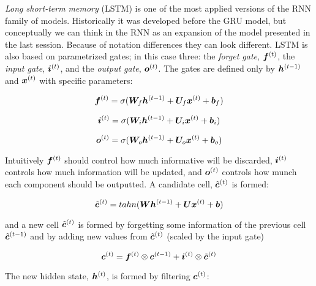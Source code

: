 \textit{Long short-term memory} (LSTM) is one of the most applied versions of the RNN family of models. Historically it was developed before the GRU model, but conceptually we can think in the RNN as an expansion of the model presented in the last session. Because of notation differences they can look different. LSTM is also based on parametrized gates; in this case three: the \textit{forget gate}, $\bm{f}^{(t)}$, the \textit{input gate}, $\bm{i}^{(t)}$, and the \textit{output gate}, $\bm{o}^{(t)}$. The gates are defined only by $\bm{h}^{(t-1)}$ and $\bm{x}^{(t)}$ with specific parameters:

\begin{equation}
\bm{f}^{(t)} = \sigma(\bm{W}_{f} \bm{h}^{(t-1)} + \bm{U}_{f} \bm{x}^{(t)} + \bm{b}_{f})
\end{equation}

\begin{equation}
\bm{i}^{(t)} = \sigma(\bm{W}_{i} \bm{h}^{(t-1)} + \bm{U}_{i} \bm{x}^{(t)} + \bm{b}_{i})
\end{equation}

\begin{equation}
\bm{o}^{(t)} = \sigma(\bm{W}_{o} \bm{h}^{(t-1)} + \bm{U}_{o} \bm{x}^{(t)} + \bm{b}_{o})
\end{equation}

Intuitively $\bm{f}^{(t)}$ should control how much informative will be discarded, $\bm{i}^{(t)}$ controls how much information will be updated, and $\bm{o}^{(t)}$ controls how munch each component should be outputted. A candidate cell, $\tilde{\bm{c}}^{(t)}$ is formed:

\begin{equation}
\tilde{\bm{c}}^{(t)} = tahn(\bm{W} \bm{h}^{(t-1)} + \bm{U} \bm{x}^{(t)} + \bm{b})
\end{equation}

and a new cell $\tilde{\bm{c}}^{(t)}$ is formed by forgetting some information of the previous cell $\tilde{\bm{c}}^{(t-1)}$ and by adding new values from $\tilde{\bm{c}}^{(t)}$ (scaled by the input gate)

\begin{equation}
\bm{c}^{(t)} = \bm{f}^{(t)} \otimes \bm{c}^{(t-1)} + \bm{i}^{(t)}\otimes \tilde{\bm{c}}^{(t)}
\end{equation}

The new hidden state, $\bm{h}^{(t)}$, is formed by filtering $\bm{c}^{(t)}$:

